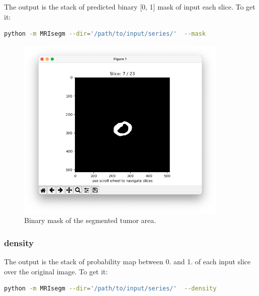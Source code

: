 \documentclass{standalone}
\begin{document}
The output is the stack of predicted binary [0, 1] mask of input each slice.
To get it:

\begin{lstlisting}[language = bash]
python -m MRIsegm --dir='/path/to/input/series/'  --mask
\end{lstlisting}

\begin{figure}[ht]

    \centering
    \includegraphics[width=0.9\textwidth]{../images/example_mask.png}

    \caption{Binary mask of the segmented tumor area.}
    \label{mask}
    
\end{figure}

\clearpage
\newpage

\subsubsection{density}

The output is the stack of probability map between 0. and 1. of each input slice over the original image.
To get it:

\begin{lstlisting}[language = bash]
python -m MRIsegm --dir='/path/to/input/series/'  --density
\end{lstlisting}
\end{document}
